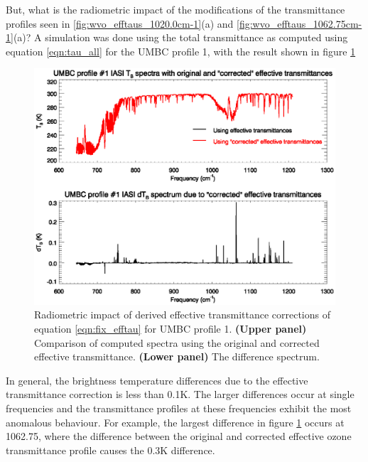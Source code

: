 But, what is the radiometric impact of the modifications of the transmittance profiles seen in \ref{fig:wvo_efftaus_1020.0cm-1}(a) and \ref{fig:wvo_efftaus_1062.75cm-1}(a)? A simulation was done using the total transmittance as computed using equation \ref{eqn:tau_all} for the UMBC profile 1, with the result shown in figure \ref{fig:rtdiff}
\begin{figure}[htp]
  \centering
  \includegraphics[scale=0.8]{graphics/rtdiff.eps}
  \caption{Radiometric impact of  derived effective transmittance corrections of equation \ref{eqn:fix_efftau} for UMBC profile 1. \textbf{(Upper panel)} Comparison of computed spectra using the original and corrected effective transmittance. \textbf{(Lower panel)} The difference spectrum.}
  \label{fig:rtdiff}
\end{figure}

In general, the brightness temperature differences due to the effective transmittance correction is less than 0.1K. The larger differences occur at single frequencies and the transmittance profiles at these frequencies exhibit the most anomalous behaviour. For example, the largest difference in figure \ref{fig:rtdiff} occurs at 1062.75\invcm, where the difference between the original and corrected effective ozone transmittance profile causes the 0.3K difference. 



